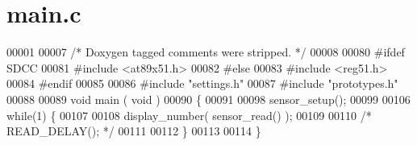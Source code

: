 \section{main.c}

\begin{DoxyCode}
00001 
00007 \textcolor{comment}{/* Doxygen tagged comments were stripped. */}
00008 
00080 \textcolor{preprocessor}{#ifdef SDCC}
00081 \textcolor{preprocessor}{}\textcolor{preprocessor}{#include <at89x51.h>}
00082 \textcolor{preprocessor}{#else}
00083 \textcolor{preprocessor}{}\textcolor{preprocessor}{#include <reg51.h>}
00084 \textcolor{preprocessor}{#endif}
00085 \textcolor{preprocessor}{}
00086 \textcolor{preprocessor}{#include "settings.h"}
00087 \textcolor{preprocessor}{#include "prototypes.h"}
00088 
00089 \textcolor{keywordtype}{void} main ( \textcolor{keywordtype}{void} )
00090 \{
00091 
00098   sensor_setup();
00099 
00106   \textcolor{keywordflow}{while}(1) \{
00107 
00108     display_number( sensor_read() );
00109 
00110     \textcolor{comment}{/* READ\_DELAY(); */}
00111 
00112   \}
00113 
00114 \}
\end{DoxyCode}
